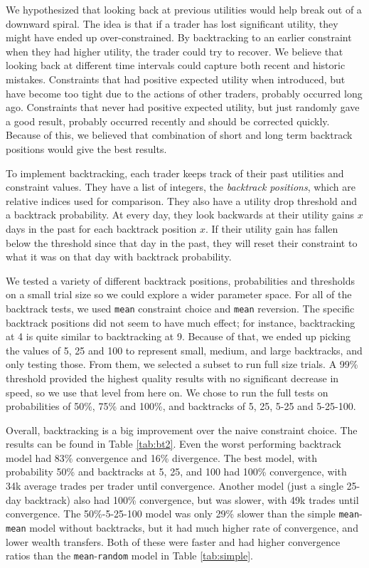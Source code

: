 \documentclass[12pt,a4paper,titlepage]{article}
\newcommand{\co}[1]{\texttt{#1}}
\begin{document}

We hypothesized that looking back at previous utilities would help break out of a downward spiral.
The idea is that if a trader has lost significant utility, they might have ended up over-constrained.
By backtracking to an earlier constraint when they had higher utility, the trader could try to recover.
We believe that looking back at different time intervals could capture both recent and historic mistakes.
Constraints that had positive expected utility when introduced, but have become too tight due to the actions of other traders, probably occurred long ago.
Constraints that never had positive expected utility, but just randomly gave a good result, probably occurred recently and should be corrected quickly.
Because of this, we believed that combination of short and long term backtrack positions would give the best results.

To implement backtracking, each trader keeps track of their past utilities and constraint values.
They have a list of integers, the \textit{backtrack positions}, which are relative indices used for comparison.
They also have a utility drop threshold and a backtrack probability.
At every day, they look backwards at their utility gains $x$ days in the past for each backtrack position $x$.
If their utility gain has fallen below the threshold since that day in the past, they will reset their constraint to what it was on that day with backtrack probability.

We tested a variety of different backtrack positions, probabilities and thresholds on a small trial size so we could explore a wider parameter space.
For all of the backtrack tests, we used \co{mean} constraint choice and \co{mean} reversion.
The specific backtrack positions did not seem to have much effect; for instance, backtracking at 4 is quite similar to backtracking at 9. 
Because of that, we ended up picking the values of 5, 25 and 100 to represent small, medium, and large backtracks, and only testing those.
From them, we selected a subset to run full size trials.
A 99\% threshold provided the highest quality results with no significant decrease in speed, so we use that level from here on.
We chose to run the full tests on probabilities of 50\%, 75\% and 100\%, and backtracks of 5, 25, 5-25 and 5-25-100. 

Overall, backtracking is a big improvement over the naive constraint choice.
The results can be found in Table \ref{tab:bt2}.
Even the worst performing backtrack model had 83\% convergence and 16\% divergence.
The best model, with probability 50\% and backtracks at 5, 25, and 100 had 100\% convergence, with 34k average trades per trader until convergence.
Another model (just a single 25-day backtrack) also had 100\% convergence, but was slower, with 49k trades until convergence.
The 50\%-5-25-100 model was only 29\% slower than the simple \co{mean}-\co{mean} model without backtracks, but it had much higher rate of convergence, and lower wealth transfers.
Both of these were faster and had higher convergence ratios than the \co{mean}-\co{random} model in Table \ref{tab:simple}.
\end{document}
